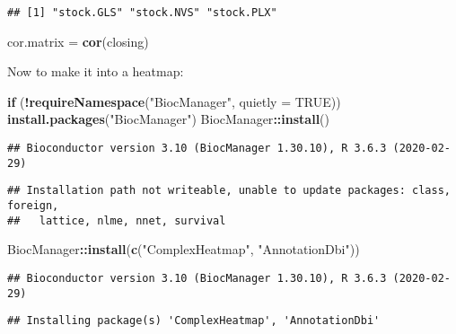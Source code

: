\documentclass[
]{article}
\newenvironment{Shaded}{\begin{snugshade}}{\end{snugshade}}
\newcommand{\ControlFlowTok}[1]{\textcolor[rgb]{0.13,0.29,0.53}{\textbf{#1}}}
\newcommand{\DataTypeTok}[1]{\textcolor[rgb]{0.13,0.29,0.53}{#1}}
\newcommand{\KeywordTok}[1]{\textcolor[rgb]{0.13,0.29,0.53}{\textbf{#1}}}
\newcommand{\NormalTok}[1]{#1}
\newcommand{\OperatorTok}[1]{\textcolor[rgb]{0.81,0.36,0.00}{\textbf{#1}}}
\newcommand{\OtherTok}[1]{\textcolor[rgb]{0.56,0.35,0.01}{#1}}
\newcommand{\StringTok}[1]{\textcolor[rgb]{0.31,0.60,0.02}{#1}}
\begin{document}
\begin{verbatim}
## [1] "stock.GLS" "stock.NVS" "stock.PLX"
\end{verbatim}

\begin{Shaded}
\begin{Highlighting}[]
\NormalTok{cor.matrix =}\StringTok{ }\KeywordTok{cor}\NormalTok{(closing)}
\end{Highlighting}
\end{Shaded}

Now to make it into a heatmap:

\begin{Shaded}
\begin{Highlighting}[]
    \ControlFlowTok{if}\NormalTok{ (}\OperatorTok{!}\KeywordTok{requireNamespace}\NormalTok{(}\StringTok{"BiocManager"}\NormalTok{, }\DataTypeTok{quietly =} \OtherTok{TRUE}\NormalTok{))}
            \KeywordTok{install.packages}\NormalTok{(}\StringTok{"BiocManager"}\NormalTok{)}
\NormalTok{    BiocManager}\OperatorTok{::}\KeywordTok{install}\NormalTok{()}
\end{Highlighting}
\end{Shaded}

\begin{verbatim}
## Bioconductor version 3.10 (BiocManager 1.30.10), R 3.6.3 (2020-02-29)
\end{verbatim}

\begin{verbatim}
## Installation path not writeable, unable to update packages: class, foreign,
##   lattice, nlme, nnet, survival
\end{verbatim}

\begin{Shaded}
\begin{Highlighting}[]
\NormalTok{    BiocManager}\OperatorTok{::}\KeywordTok{install}\NormalTok{(}\KeywordTok{c}\NormalTok{(}\StringTok{"ComplexHeatmap"}\NormalTok{, }\StringTok{"AnnotationDbi"}\NormalTok{))}
\end{Highlighting}
\end{Shaded}

\begin{verbatim}
## Bioconductor version 3.10 (BiocManager 1.30.10), R 3.6.3 (2020-02-29)
\end{verbatim}

\begin{verbatim}
## Installing package(s) 'ComplexHeatmap', 'AnnotationDbi'
\end{verbatim}
\end{document}
